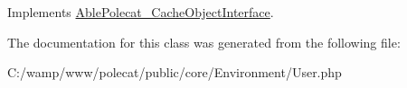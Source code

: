 Implements \hyperlink{interface_able_polecat___cache_object_interface_a3f2135f6ad45f51d075657f6d20db2cd}{Able\+Polecat\+\_\+\+Cache\+Object\+Interface}.



The documentation for this class was generated from the following file\+:\begin{DoxyCompactItemize}
\item 
C\+:/wamp/www/polecat/public/core/\+Environment/User.\+php\end{DoxyCompactItemize}
